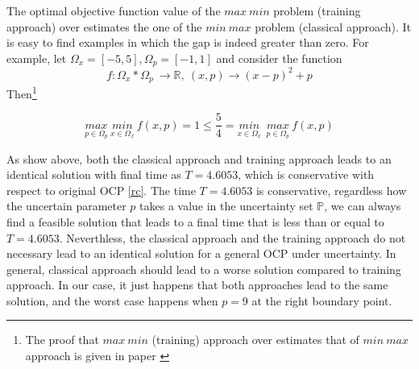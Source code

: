 \documentclass  [
  paper    = a4,
  BCOR     = 10mm,
  twoside,
  fontsize = 12pt,
  fleqn,
  toc      = bibnumbered,
  toc      = listofnumbered,
  numbers  = noendperiod,
  headings = normal,
  listof   = leveldown,
  version  = 3.03
]                                       {scrreprt}
\newcommand{\<}{\langle}
\renewcommand{\>}{\rangle}
\begin{document}
The optimal objective function value of the $max\  min$ problem (training approach) over estimates the one of the $min\ max$ problem (classical approach). It is easy to find examples in which the gap is indeed greater than zero. For example, let $\Omega_x=[-5,5],\Omega_p=[-1,1]$ and consider the function
$$
f : \Omega_x *  \Omega_p \  \rightarrow \mathbb{R}, \ (x,p) \rightarrow (x-p)^2 + p
$$
Then\footnote{The proof that $max\ min$  (training) approach over estimates that of $min \ max$ approach is given in paper \cite{MatSch22}}

$$	\underset{p \in \Omega_p}{max}\ \underset{x \in \Omega_x}{min}\ f (x,p) =1 \leq \frac{5}{4} = \underset{x \in \Omega_x}{min}\ \ \underset{p \in \Omega_p}{max}\ f (x,p)
$$


As show above, both the classical approach and training approach leads to an identical solution with final time as $T=4.6053$, which is conservative with respect to original OCP \ref{rc}. The time $T=4.6053$ is conservative, regardless how the uncertain parameter $p$ takes a value in the uncertainty set $\mathbb{P}$, we can always find a feasible solution that leads to a final time that is less than or equal to $T=4.6053$. Neverthless, the classical approach and the training approach do not necessary lead to an identical solution for a general OCP under uncertainty. In general, classical approach should lead to a worse solution compared to training approach. In our case, it just happens that both approaches lead to the same solution, and the worst case happens when $p=9$ at the right boundary point. %

\end{document}
